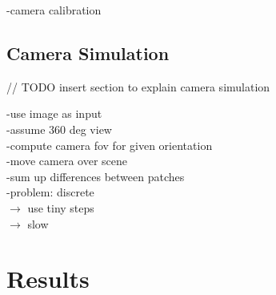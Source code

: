 \documentclass[10pt,twocolumn,letterpaper]{article}
\begin{document}
-camera calibration\\

\subsection{Camera Simulation}

// TODO insert section to explain camera simulation

-use image as input\\
-assume 360 deg view\\
-compute camera fov for given orientation\\
-move camera over scene\\
-sum up differences between patches\\
-problem: discrete\\
	$\rightarrow$ use tiny steps\\
		$\rightarrow$ slow\\

\section{Results}




{\small


}
\end{document}
